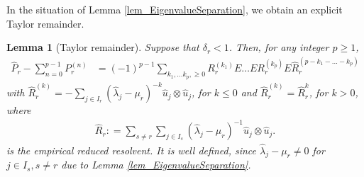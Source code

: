 \documentclass[a4paper,11pt]{article} %
\numberwithin{equation}{section}
\theoremstyle{definition}
\theoremstyle{remark}
\theoremstyle{plain}
\newtheorem{lemma}[definition]{Lemma}
\begin{document}
\noindent In the situation of Lemma \ref{lem_EigenvalueSeparation}, we obtain
an explicit Taylor remainder.

\begin{lemma}[Taylor remainder]%
  \label{lem_TaylorRemainder}
  Suppose that \( \delta_{r} < 1 \).
  Then, for any integer \( p \ge 1 \), 
  \begin{align}
    \label{eq_A_TaylorRemainder}
        \widehat{P}_{r} - \sum_{n = 0}^{p - 1} P_{r}^{ (n) }
    & = 
        (-1)^{p - 1} 
        \sum_{k_{1}, \dots k_{p}, \ge 0} 
        R_{r}^{ ( k_{1} ) } E \dots E R_{r}^{ ( k_{p} ) } 
        E \widehat{R}_{r}^{ ( p - k_{1} - \dots - k_{p} ) }
  \end{align}
  with 
  \( 
    \widehat{R}_{r}^{ (k) } = - \sum_{ j \in I_{r} }  
                                ( \widehat{ \lambda }_{j} - \mu_{r} )^{ - k }
                                \widehat{u}_{j} \otimes \widehat{u}_{j} 
  \),
  for \( k \le 0 \) and \( \widehat{R}_{r}^{ (k) } = \widehat{R}_{r} ^{k} \),
  for  \( k > 0 \), where 
  \begin{align}
    \widehat{R}_{r}: = \sum_{ s \ne r } \sum_{ j \in I_{s} } 
                       ( \widehat{ \lambda }_{j} - \mu_{r}  )^{-1} 
                       \widehat{u}_{j} \otimes \widehat{u}_{j}.
  \end{align}
  is the empirical reduced resolvent.
  It is well defined, since \( \widehat{ \lambda }_{j} - \mu_{r} \ne 0 \) for 
  \( j \in I_{s}, s \ne r \)  due to Lemma 
  \normalfont \ref{lem_EigenvalueSeparation}.
\end{lemma}%
\end{document}
